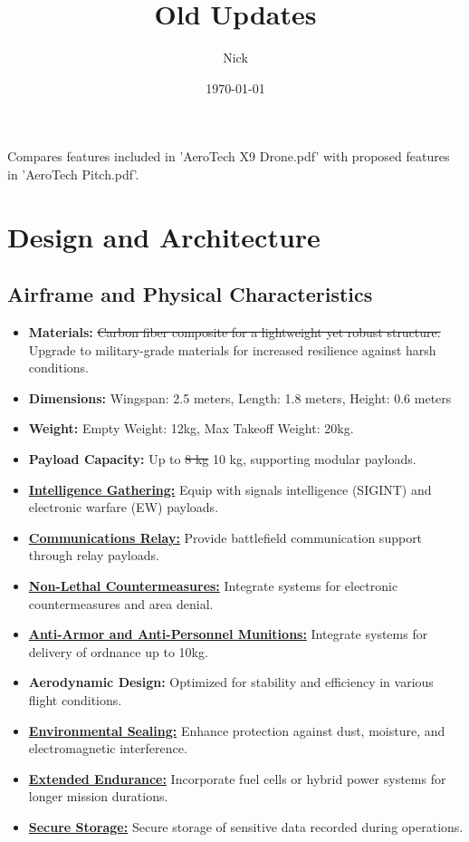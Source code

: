 \documentclass{article}
\title{Old Updates}
\author{Nick}
\date{\today}
\begin{document}
\maketitle

\par Compares features included in 'AeroTech X9 Drone.pdf' with proposed features in 'AeroTech Pitch.pdf'.

\section{Design and Architecture}
\subsection{Airframe and Physical Characteristics}
\begin{itemize}
    \item \textbf{Materials:} \st{Carbon fiber composite for a lightweight yet robust structure.} Upgrade to military-grade materials for increased resilience against harsh conditions.
    \item \textbf{Dimensions:} Wingspan: 2.5 meters, Length: 1.8 meters, Height: 0.6 meters
    \item \textbf{Weight:} Empty Weight: 12\si{kg}, Max Takeoff Weight: 20\si{kg}.
    \item \textbf{Payload Capacity:} Up to \st{8 kg} 10 kg, supporting modular payloads.
    \item \textbf{\underline{Intelligence Gathering:}} Equip with signals intelligence (SIGINT) and electronic warfare (EW) payloads.
    \item \textbf{\underline{Communications Relay:}} Provide battleﬁeld communication support through relay payloads.
    \item \textbf{\underline{Non-Lethal Countermeasures:}} Integrate systems for electronic countermeasures and area denial.
    \item \textbf{\underline{Anti-Armor and Anti-Personnel Munitions:}} Integrate systems for delivery of ordnance up to 10kg.
    \item \textbf{Aerodynamic Design:} Optimized for stability and efficiency in various flight conditions.
    \item \textbf{\underline{Environmental Sealing:}} Enhance protection against dust, moisture, and electromagnetic interference.
    \item \textbf{\underline{Extended Endurance:}} Incorporate fuel cells or hybrid power systems for longer mission durations.
    \item \textbf{\underline{Secure Storage:}} Secure storage of sensitive data recorded during operations.
\end{itemize}
\end{document}
